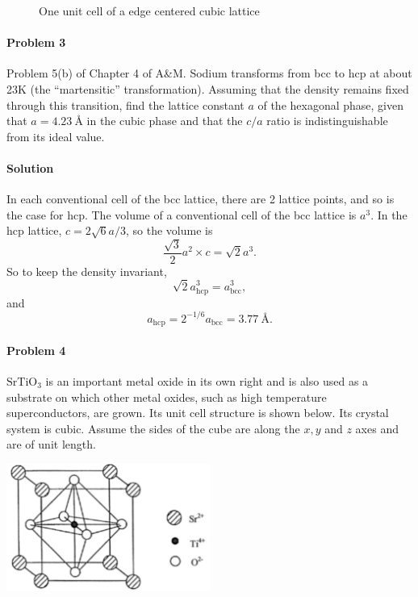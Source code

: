 \documentclass[hyperref, a4paper]{article}
\begin{document}
\begin{figure}
    \centering
    
    \caption{One unit cell of a edge centered cubic lattice}
    \label{fig:unit-cell-edge-centered}
\end{figure}

\paragraph{Problem 3} Problem 5(b) of Chapter 4 of A\&M.
Sodium transforms from bcc to hcp at about 23K (the ``martensitic'' transformation). Assuming that the density remains fixed through this transition, find the lattice constant $a$ of the hexagonal phase, given that $a=\SI{4.23}{\angstrom}$ in the cubic phase and that the $c / a$ ratio is indistinguishable from its ideal value.

\paragraph{Solution} In each conventional cell of the bcc lattice, 
there are 2 lattice points, and so is the case for hcp.
The volume of a conventional cell of the bcc lattice is $a^3$.
In the hcp lattice, $c = 2 \sqrt{6} a / 3$,
so the volume is 
\[
    \frac{\sqrt{3}}{2} a^2 \times c = \sqrt{2} a^3.
\]
So to keep the density invariant,
\[
    \sqrt{2} a_\text{hcp}^3 = a_{\text{bcc}}^3,
\]
and 
\begin{equation}
    a_{\text{hcp}} = 2^{-1/6} a_{\text{bcc}} = \SI{3.77}{\angstrom}.
\end{equation}

\paragraph{Problem 4} $\mathrm{SrTiO}_3$ is an important metal oxide in its own right and is also used as a substrate on which other metal oxides, such as high temperature superconductors, are
grown. Its unit cell structure is shown below. Its crystal system is cubic. Assume the sides of the cube are along the $x, y$ and $z$ axes and are of unit length.

\begin{center}
    \includegraphics[width=0.5\textwidth]{lattices/SrTiO3.PNG}
\end{center}
\end{document}
